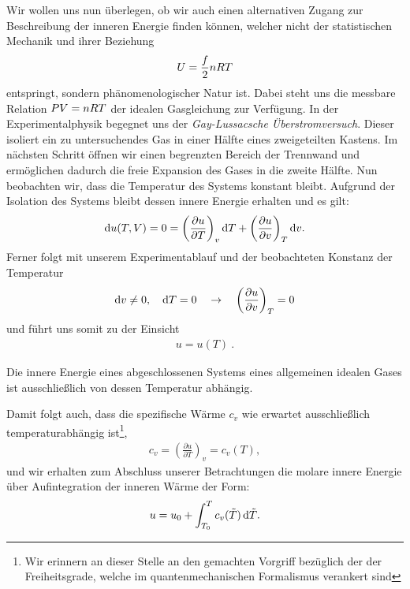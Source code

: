 Wir wollen uns nun überlegen, ob wir auch einen alternativen Zugang zur Beschreibung der inneren Energie finden können, welcher nicht der statistischen Mechanik und ihrer Beziehung
\begin{align*}
    U=\frac{f}{2}n RT
\end{align*}
entspringt, sondern phänomenologischer Natur ist.
Dabei steht uns die messbare Relation $PV=n RT$ der idealen Gasgleichung zur Verfügung.
In der Experimentalphysik begegnet uns der \emph{Gay-Lussacsche Überstromversuch}. Dieser isoliert ein zu untersuchendes Gas in einer Hälfte eines zweigeteilten Kastens. Im nächsten Schritt öffnen wir einen begrenzten Bereich der Trennwand und ermöglichen dadurch die freie Expansion des Gases in die zweite Hälfte. Nun beobachten wir, dass die Temperatur des Systems konstant bleibt.
Aufgrund der Isolation des Systems bleibt dessen innere Energie erhalten und es gilt:
\begin{align*}
    \mathop{}\!\mathrm{d} u(T,V)=0=\left(\frac{\partial u}{\partial T}\right)_v\mathop{}\!\mathrm{d} T+\left(\frac{\partial u}{\partial v}\right)_T\mathop{}\!\mathrm{d} v.
\end{align*}
Ferner folgt mit unserem Experimentablauf und der beobachteten Konstanz der Temperatur
\begin{align*}
    \mathop{}\!\mathrm{d} v \neq 0,\quad\mathop{}\!\mathrm{d} T=0\quad\rightarrow\quad \left(\frac{\partial u}{\partial v}\right)_T=0
\end{align*}
und führt uns somit zu der Einsicht
\begin{align*}
    \boxed{u=u(T)}\:.
\end{align*}
\begin{formal}
    Die innere Energie eines abgeschlossenen Systems eines allgemeinen idealen Gases ist ausschließlich von dessen Temperatur abhängig.
\end{formal}
Damit folgt auch, dass die spezifische Wärme $c_v$ \textendash{} wie erwartet \textendash{} ausschließlich temperaturabhängig ist\footnote{Wir erinnern an dieser Stelle an den gemachten Vorgriff bezüglich der  der Freiheitsgrade, welche im quantenmechanischen Formalismus verankert sind},
\begin{align*}
    c_v=\left(\frac{\partial u}{\partial T}\right)_v=c_v(T),
\end{align*}
und wir erhalten zum Abschluss unserer Betrachtungen die molare innere Energie über Aufintegration der inneren Wärme der Form:
\begin{align*}
    u=u_0+\int_{T_0}^Tc_v(\Tilde{T})\mathop{}\!\mathrm{d} \Tilde{T}.
\end{align*}
